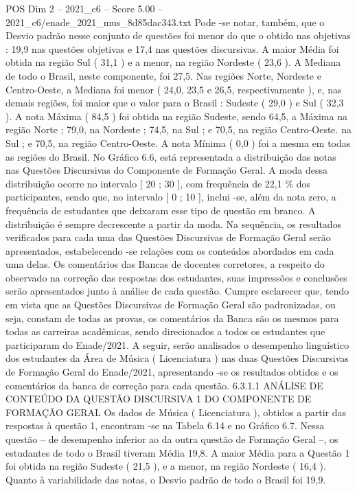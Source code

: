 \begin{textsample}{POS Dim 2 – 2021\_c6 – Score 5.00 – 2021\_c6/enade\_2021\_mus\_8d85dac343.txt}
Pode -se notar, também, que o Desvio padrão nesse conjunto de questões foi menor do que o obtido nas objetivas : 19,9 nas questões objetivas e 17,4 nas questões discursivas.
A maior Média foi obtida na região Sul ( 31,1 ) e a menor, na região Nordeste ( 23,6 ).
A Mediana de todo o Brasil, neste componente, foi 27,5.
Nas regiões Norte, Nordeste e Centro-Oeste, a Mediana foi menor ( 24,0, 23,5 e 26,5, respectivamente ), e, nas demais regiões, foi maior que o valor para o Brasil : Sudeste ( 29,0 ) e Sul ( 32,3 ).
A nota Máxima ( 84,5 ) foi obtida na região Sudeste, sendo 64,5, a Máxima na região Norte ; 79,0, na Nordeste ; 74,5, na Sul ; e 70,5, na região Centro-Oeste. na Sul ; e 70,5, na região Centro-Oeste.
A nota Mínima ( 0,0 ) foi a mesma em todas as regiões do Brasil.
No Gráfico 6.6, está representada a distribuição das notas nas Questões Discursivas do Componente de Formação Geral.
A moda dessa distribuição ocorre no intervalo [ 20 ; 30 ], com frequência de 22,1 \% dos participantes, sendo que, no intervalo [ 0 ; 10 ], inclui -se, além da nota zero, a frequência de estudantes que deixaram esse tipo de questão em branco.
A distribuição é sempre decrescente a partir da moda.
Na sequência, os resultados verificados para cada uma das Questões Discursivas de Formação Geral serão apresentados, estabelecendo -se relações com os conteúdos abordados em cada uma delas.
Os comentários das Bancas de docentes corretores, a respeito do observado na correção das respostas dos estudantes, suas impressões e conclusões serão apresentados junto à análise de cada questão.
Cumpre esclarecer que, tendo em vista que as Questões Discursivas de Formação Geral são padronizadas, ou seja, constam de todas as provas, os comentários da Banca são os mesmos para todas as carreiras acadêmicas, sendo direcionados a todos os estudantes que participaram do Enade/2021.
A seguir, serão analisados o desempenho linguístico dos estudantes da Área de Música ( Licenciatura ) nas duas Questões Discursivas de Formação Geral do Enade/2021, apresentando -se os resultados obtidos e os comentários da banca de correção para cada questão. 6.3.1.1 ANÁLISE DE CONTEÚDO DA QUESTÃO DISCURSIVA 1 DO COMPONENTE DE FORMAÇÃO GERAL Os dados de Música ( Licenciatura ), obtidos a partir das respostas à questão 1, encontram -se na Tabela 6.14 e no Gráfico 6.7.
Nessa questão – de desempenho inferior ao da outra questão de Formação Geral –, os estudantes de todo o Brasil tiveram Média 19,8.
A maior Média para a Questão 1 foi obtida na região Sudeste ( 21,5 ), e a menor, na região Nordeste ( 16,4 ).
Quanto à variabilidade das notas, o Desvio padrão de todo o Brasil foi 19,9.

\end{textsample}
